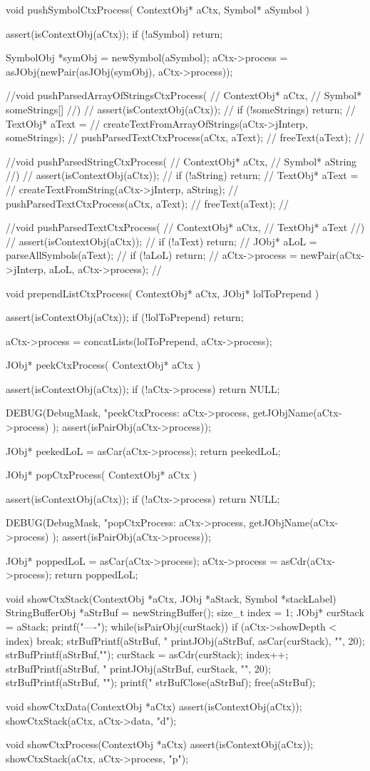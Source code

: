 void pushSymbolCtxProcess(
  ContextObj* aCtx,
  Symbol* aSymbol
) {
  assert(isContextObj(aCtx));
  if (!aSymbol) return;

  SymbolObj *symObj = newSymbol(aSymbol);
  aCtx->process =
    asJObj(newPair(asJObj(symObj), aCtx->process));
}

//void pushParsedArrayOfStringsCtxProcess(
//  ContextObj* aCtx,
//  Symbol* someStrings[]
//) {
//  assert(isContextObj(aCtx));
//  if (!someStrings) return;
//  TextObj* aText =
//    createTextFromArrayOfStrings(aCtx->jInterp, someStrings);
//  pushParsedTextCtxProcess(aCtx, aText);
//  freeText(aText);
//}

//void pushParsedStringCtxProcess(
//  ContextObj* aCtx,
//  Symbol* aString
//) {
//  assert(isContextObj(aCtx));
//  if (!aString) return;
//  TextObj* aText =
//    createTextFromString(aCtx->jInterp, aString);
//  pushParsedTextCtxProcess(aCtx, aText);
//  freeText(aText);
//}

//void pushParsedTextCtxProcess(
//  ContextObj* aCtx,
//  TextObj* aText
//) {
//  assert(isContextObj(aCtx));
//  if (!aText) return;
//  JObj* aLoL = parseAllSymbols(aText);
//  if (!aLoL) return;
//  aCtx->process = newPair(aCtx->jInterp, aLoL, aCtx->process);
//}

void prependListCtxProcess(
  ContextObj* aCtx,
  JObj* lolToPrepend
) {
  assert(isContextObj(aCtx));
  if (!lolToPrepend) return;

  aCtx->process =
    concatLists(lolToPrepend, aCtx->process);
}

JObj* peekCtxProcess(
  ContextObj* aCtx
) {
  assert(isContextObj(aCtx));
  if (!aCtx->process) return NULL;

  DEBUG(DebugMask, "peekCtxProcess: %
    aCtx->process, getJObjName(aCtx->process)
  );
  assert(isPairObj(aCtx->process));
 
  JObj* peekedLoL = asCar(aCtx->process);
  return peekedLoL;
}

JObj* popCtxProcess(
  ContextObj* aCtx
) {
  assert(isContextObj(aCtx));
  if (!aCtx->process) return NULL;

  DEBUG(DebugMask, "popCtxProcess: %
    aCtx->process, getJObjName(aCtx->process)
  );
  assert(isPairObj(aCtx->process));
 
  JObj* poppedLoL = asCar(aCtx->process);
  aCtx->process   = asCdr(aCtx->process);
  return poppedLoL;
}

void showCtxStack(ContextObj *aCtx, JObj *aStack, Symbol *stackLabel) {
  StringBufferObj *aStrBuf = newStringBuffer();
  size_t index = 1;
  JObj* curStack = aStack;
  printf("----\n");
  while(isPairObj(curStack)) {
    if (aCtx->showDepth < index) break;
    strBufPrintf(aStrBuf, "%
    printJObj(aStrBuf, asCar(curStack), "", 20);
    strBufPrintf(aStrBuf,"\n");
    curStack = asCdr(curStack);
    index++;
  }
  strBufPrintf(aStrBuf, "%
  printJObj(aStrBuf, curStack, "", 20);
  strBufPrintf(aStrBuf, "\n");
  printf("%
  strBufClose(aStrBuf);
  free(aStrBuf);
}

void showCtxData(ContextObj *aCtx) {
  assert(isContextObj(aCtx));
  showCtxStack(aCtx, aCtx->data, "d");
}

void showCtxProcess(ContextObj *aCtx) {
  assert(isContextObj(aCtx));
  showCtxStack(aCtx, aCtx->process, "p");
}

\stopCCode